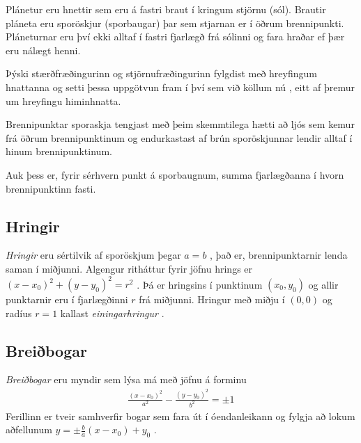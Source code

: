 \documentclass[a4paper,10pt,icelandic]{sphinxmanual}
\begin{document}
Plánetur eru hnettir sem eru á fastri braut í kringum stjörnu (sól).
Brautir pláneta eru sporöskjur (sporbaugar) þar sem stjarnan er í öðrum brennipunkti.
Pláneturnar eru því ekki alltaf í fastri fjarlægð frá sólinni og fara hraðar ef þær eru nálægt henni.

\begin{figure}[htbp]
\centering

\noindent{}
\end{figure}

Þýski stærðfræðingurinn og stjörnufræðingurinn  fylgdist með hreyfingum hnattanna og setti þessa uppgötvun fram í því sem við köllum nú , eitt af þremur um hreyfingu himinhnatta.

Brennipunktar sporaskja tengjast með þeim skemmtilega hætti að ljós sem kemur frá öðrum brennipunktinum og endurkastast af brún sporöskjunnar lendir alltaf í hinum brennipunktinum.

Auk þess er, fyrir sérhvern punkt á sporbaugnum, summa fjarlægðanna í hvorn brennipunktinn fasti.

\begin{figure}[htbp]
\centering

\noindent{}
\end{figure}


\subsection{Hringir}
\label{\detokenize{Kafli03:hringir}}
\textit{Hringir} eru sértilvik af sporöskjum þegar \(a=b\) , það er, brennipunktarnir lenda saman í miðjunni.
Algengur ritháttur fyrir jöfnu hrings er \((x-x_0)^2+(y-y_0)^2=r^2\) .
Þá er  hringsins í punktinum \((x_0,y_0)\) og allir punktarnir eru í fjarlægðinni \(r\) frá miðjunni.
Hringur með miðju í \((0,0)\) og radíus \(r=1\) kallast \textit{einingarhringur} .

\begin{figure}[htbp]
\centering

\noindent{}
\end{figure}


\subsection{Breiðbogar}
\label{\detokenize{Kafli03:breibogar}}
\textit{Breiðbogar} eru myndir sem lýsa má með jöfnu á forminu
\begin{equation*}
\begin{split}\frac{(x-x_0)^2}{a^2} - \frac{(y-y_0)^2}{b^2} =\pm 1\end{split}
\end{equation*}
Ferillinn er tveir samhverfir bogar sem fara út í óendanleikann og fylgja að lokum aðfellunum \(y=\pm \frac{b}{a}(x-x_0)+y_0\) .
\end{document}
